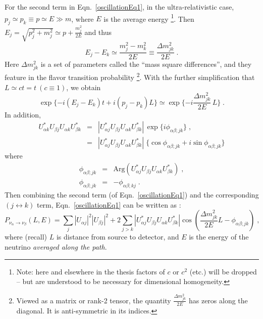 For the second term in Eqn.~\ref{oscillationEq1}, in the ultra-relativistic case, $p_j\simeq p_k\equiv p\simeq E\gg m$, where $E$ is the average energy \footnote{Note: here and elsewhere in the thesis factors of $c$ or $c^2$ (etc.) will be dropped -- but are understood to be necessary for dimensional homogeneity.}. Then $E_j=\sqrt{p^2_j+m^2_j}\simeq p+\frac{m_j^2}{2E}$ and thus \cite{pdg2020,aitchison2012gauge}
\begin{equation}
E_j-E_k\simeq \frac{m^2_j-m^2_k}{2E}\equiv \frac{\Delta m^2_{jk}}{2E} \; .
\end{equation}
Here $\Delta m^2_{jk}$ is a set of parameters called the ``mass square differences'', and they feature in the flavor transition probability \footnote{Viewed as a matrix or rank-2 tensor, the quantity $\frac{\Delta m^2_{jk}}{2E}$ has zeros along the diagonal. It is anti-symmetric in its indices.}. With the further simplification that $L\simeq ct=t~(c\equiv 1)$, we obtain
\begin{equation*}
\exp\{-i(E_j-E_k)t+i(p_j-p_k)L\}\simeq \exp\{-i\frac{\Delta m^2_{jk}}{2E} \, L\} \; .
\end{equation*}
In addition,
\begin{eqnarray*}
U^*_{\alpha k}U_{\beta j}U_{\alpha k}U^*_{\beta k} &=& |U^*_{\alpha j}U_{\beta j}U_{\alpha k}U^*_{\beta k}| \, \exp\{i\phi_{\alpha\beta;jk}\} \; ,\\
&=& |U^*_{\alpha j}U_{\beta j}U_{\alpha k}U^*_{\beta k}| \; \{ \cos \phi_{\alpha\beta;jk} + i \sin \phi_{\alpha\beta;jk}\}
\end{eqnarray*}
where 
\begin{eqnarray*}
\phi_{\alpha\beta;jk} &=& \mathrm{Arg}(U^*_{\alpha j}U_{\beta j}U_{\alpha k}U^*_{\beta k}) \; , \\
\phi_{\alpha\beta;jk} &=& -\phi_{\alpha\beta;kj} \; .
\end{eqnarray*}
Then combining the second term (of Eqn.~\ref{oscillationEq1}) and the corresponding $(j\leftrightarrow k)$ term, Eqn.~\ref{oscillationEq1} can be written as \cite{aitchison2012gauge}:
\begin{equation}\label{oscillationEq2}
P_{\nu_\alpha\to\nu_\beta}(L,E)=
\sum_j |U_{\alpha j}|^2|U_{\beta j}|^2 + 2\sum_{j>k}|U^*_{\alpha j}U_{\beta j}U_{\alpha k}U^*_{\beta k}|\cos(\frac{\Delta m^2_{jk}}{2E}L-\phi_{\alpha\beta;jk}) \; ,
\end{equation}
where (recall) $L$ is distance from source to detector, and $E$ is the energy of the neutrino {\em averaged along the path}.

